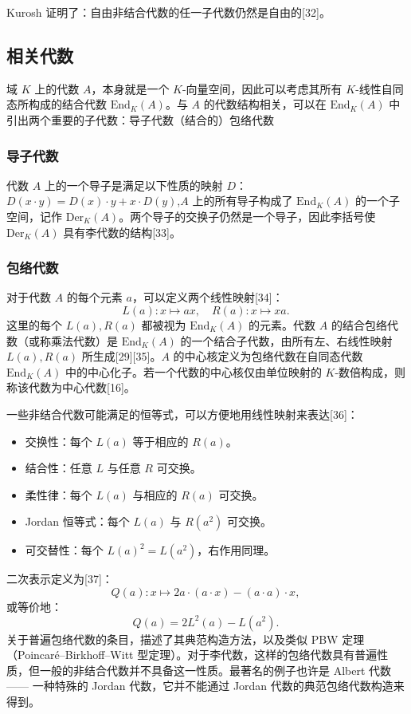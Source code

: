 Kurosh 证明了：自由非结合代数的任一子代数仍然是自由的[32]。
\subsection{相关代数}
域 $K$ 上的代数 $A$，本身就是一个 $K$-向量空间，因此可以考虑其所有 $K$-线性自同态所构成的结合代数 $\mathrm{End}_K(A)$。与 $A$ 的代数结构相关，可以在 $\mathrm{End}_K(A)$ 中引出两个重要的子代数：导子代数（结合的）包络代数
\subsubsection{导子代数}
代数 $A$ 上的一个导子是满足以下性质的映射 $D$：$D(x \cdot y) = D(x) \cdot y + x \cdot D(y)$,$A$ 上的所有导子构成了 $\mathrm{End}_K(A)$ 的一个子空间，记作 $\mathrm{Der}_K(A)$。两个导子的交换子仍然是一个导子，因此李括号使 $\mathrm{Der}_K(A)$ 具有李代数的结构[33]。
\subsubsection{包络代数}
对于代数 $A$ 的每个元素 $a$，可以定义两个线性映射[34]：
$$
L(a): x \mapsto ax ,\quad R(a): x \mapsto xa.~
$$
这里的每个 $L(a), R(a)$ 都被视为 $\mathrm{End}_K(A)$ 的元素。代数 $A$ 的结合包络代数（或称乘法代数）是 $\mathrm{End}_K(A)$ 的一个结合子代数，由所有左、右线性映射 $L(a), R(a)$ 所生成[29][35]。$A$ 的中心核定义为包络代数在自同态代数 $\mathrm{End}_K(A)$ 中的中心化子。若一个代数的中心核仅由单位映射的 $K$-数倍构成，则称该代数为中心代数[16]。

一些非结合代数可能满足的恒等式，可以方便地用线性映射来表达[36]：
\begin{itemize}
\item 交换性：每个 $L(a)$ 等于相应的 $R(a)$。
\item 结合性：任意 $L$ 与任意 $R$ 可交换。
\item 柔性律：每个 $L(a)$ 与相应的 $R(a)$ 可交换。
\item Jordan 恒等式：每个 $L(a)$ 与 $R(a^2)$ 可交换。
\item 可交替性：每个 $L(a)^2 = L(a^2)$，右作用同理。
\end{itemize}
二次表示定义为[37]：
$$
Q(a): x \mapsto 2a \cdot (a \cdot x) - (a \cdot a)\cdot x,~
$$
或等价地：
$$
Q(a) = 2L^2(a) - L(a^2).~
$$
关于普遍包络代数的条目，描述了其典范构造方法，以及类似 PBW 定理（Poincaré–Birkhoff–Witt 型定理）。对于李代数，这样的包络代数具有普遍性质，但一般的非结合代数并不具备这一性质。最著名的例子也许是 Albert 代数 —— 一种特殊的 Jordan 代数，它并不能通过 Jordan 代数的典范包络代数构造来得到。
